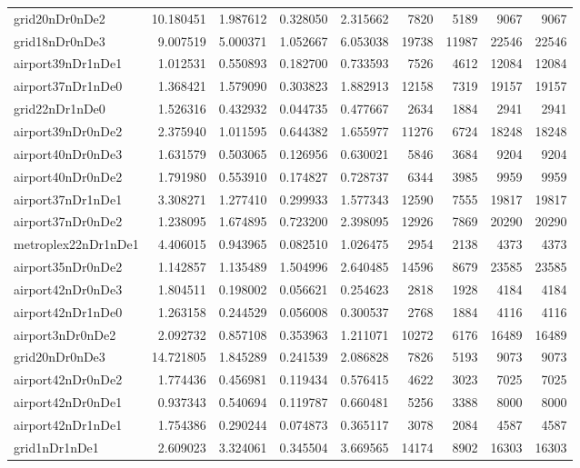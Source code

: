\begin{longtable}{|l|r|r|r|r|r|r|r|r|}
grid20nDr0nDe2 & 10.180451 & 1.987612 & 0.328050 & 2.315662 & 7820 & 5189 & 9067 & 9067 \\
grid18nDr0nDe3 & 9.007519 & 5.000371 & 1.052667 & 6.053038 & 19738 & 11987 & 22546 & 22546 \\
airport39nDr1nDe1 & 1.012531 & 0.550893 & 0.182700 & 0.733593 & 7526 & 4612 & 12084 & 12084 \\
airport37nDr1nDe0 & 1.368421 & 1.579090 & 0.303823 & 1.882913 & 12158 & 7319 & 19157 & 19157 \\
grid22nDr1nDe0 & 1.526316 & 0.432932 & 0.044735 & 0.477667 & 2634 & 1884 & 2941 & 2941 \\
airport39nDr0nDe2 & 2.375940 & 1.011595 & 0.644382 & 1.655977 & 11276 & 6724 & 18248 & 18248 \\
airport40nDr0nDe3 & 1.631579 & 0.503065 & 0.126956 & 0.630021 & 5846 & 3684 & 9204 & 9204 \\
airport40nDr0nDe2 & 1.791980 & 0.553910 & 0.174827 & 0.728737 & 6344 & 3985 & 9959 & 9959 \\
airport37nDr1nDe1 & 3.308271 & 1.277410 & 0.299933 & 1.577343 & 12590 & 7555 & 19817 & 19817 \\
airport37nDr0nDe2 & 1.238095 & 1.674895 & 0.723200 & 2.398095 & 12926 & 7869 & 20290 & 20290 \\
metroplex22nDr1nDe1 & 4.406015 & 0.943965 & 0.082510 & 1.026475 & 2954 & 2138 & 4373 & 4373 \\
airport35nDr0nDe2 & 1.142857 & 1.135489 & 1.504996 & 2.640485 & 14596 & 8679 & 23585 & 23585 \\
airport42nDr0nDe3 & 1.804511 & 0.198002 & 0.056621 & 0.254623 & 2818 & 1928 & 4184 & 4184 \\
airport42nDr1nDe0 & 1.263158 & 0.244529 & 0.056008 & 0.300537 & 2768 & 1884 & 4116 & 4116 \\
airport3nDr0nDe2 & 2.092732 & 0.857108 & 0.353963 & 1.211071 & 10272 & 6176 & 16489 & 16489 \\
grid20nDr0nDe3 & 14.721805 & 1.845289 & 0.241539 & 2.086828 & 7826 & 5193 & 9073 & 9073 \\
airport42nDr0nDe2 & 1.774436 & 0.456981 & 0.119434 & 0.576415 & 4622 & 3023 & 7025 & 7025 \\
airport42nDr0nDe1 & 0.937343 & 0.540694 & 0.119787 & 0.660481 & 5256 & 3388 & 8000 & 8000 \\
airport42nDr1nDe1 & 1.754386 & 0.290244 & 0.074873 & 0.365117 & 3078 & 2084 & 4587 & 4587 \\
grid1nDr1nDe1 & 2.609023 & 3.324061 & 0.345504 & 3.669565 & 14174 & 8902 & 16303 & 16303 \\

\end{longtable}
